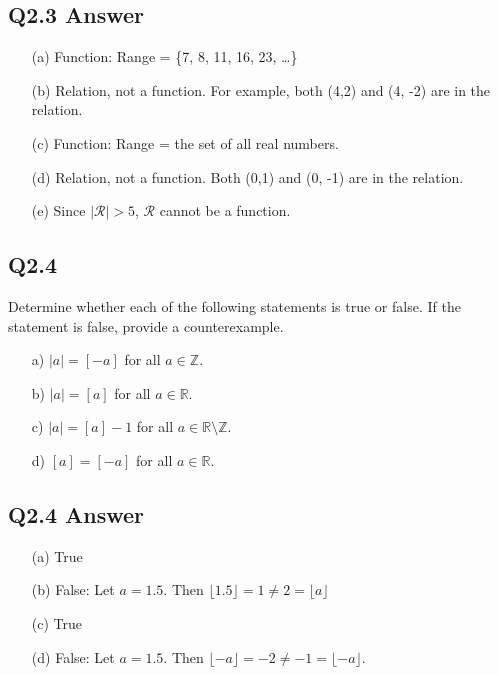 \documentclass{article}
\begin{document}
\subsection*{Q2.3 Answer}
\begin{enumerate}
    \item[(a)] Function: Range = \{7, 8, 11, 16, 23, \ldots\}
    \item[(b)] Relation, not a function. For example, both (4,2) and (4, -2) are in the relation.
    \item[(c)] Function: Range = the set of all real numbers.
    \item[(d)] Relation, not a function. Both (0,1) and (0, -1) are in the relation.
    \item[(e)] Since \( |\mathcal{R}| > 5 \), \( \mathcal{R} \) cannot be a function.
\end{enumerate}
\newpage
{}
\subsection*{Q2.4}
Determine whether each of the following statements is true or false. If the statement is false, provide a counterexample.
\begin{enumerate}
    \item[a)] \( |a| = [-a] \) for all \( a \in \mathbb{Z} \).
    \item[b)] \( |a| = [a] \) for all \( a \in \mathbb{R} \).
    \item[c)] \( |a| = [a] - 1 \) for all \( a \in \mathbb{R} \setminus \mathbb{Z} \).
    \item[d)] \( [a] = [-a] \) for all \( a \in \mathbb{R} \).
\end{enumerate}
\newpage
{}
\subsection*{Q2.4 Answer}
\begin{enumerate}
    \item[(a)] True
    \item[(b)] False: Let \( a = 1.5 \). Then \( \lfloor 1.5 \rfloor = 1 \neq 2 = \lfloor a \rfloor \)
    \item[(c)] True
    \item[(d)] False: Let \( a = 1.5 \). Then \( \lfloor -a \rfloor = -2 \neq -1 = \lfloor -a \rfloor \).
\end{enumerate}
\newpage
{}
\end{document}
